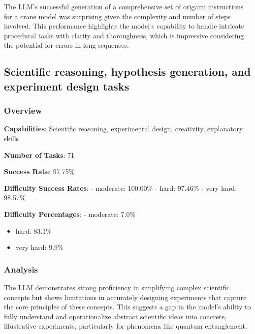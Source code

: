 \documentclass[fleqn,10pt]{wlscirep}
\begin{document}
The LLM's successful generation of a comprehensive set of origami
instructions for a crane model was surprising given the complexity and
number of steps involved. This performance highlights the model's
capability to handle intricate procedural tasks with clarity and
thoroughness, which is impressive considering the potential for errors
in long sequences.

\hypertarget{scientific-reasoning-hypothesis-generation-and-experiment-design-tasks}{%
\subsection{Scientific reasoning, hypothesis generation, and experiment
design
tasks}\label{scientific-reasoning-hypothesis-generation-and-experiment-design-tasks}}

\hypertarget{overview-2}{%
\subsubsection{Overview}\label{overview-2}}

\textbf{Capabilities}: Scientific reasoning, experimental design,
creativity, explanatory skills

\textbf{Number of Tasks}: 71

\textbf{Success Rate}: 97.75\%

\textbf{Difficulty Success Rates}: - moderate: 100.00\% - hard: 97.46\%
- very hard: 98.57\%

\textbf{Difficulty Percentages}: - moderate: 7.0\%

\begin{itemize}
\item
  hard: 83.1\%
\item
  very hard: 9.9\%
\end{itemize}

\hypertarget{analysis-1}{%
\subsubsection{Analysis}\label{analysis-1}}

The LLM demonstrates strong proficiency in simplifying complex
scientific concepts but shows limitations in accurately designing
experiments that capture the core principles of these concepts. This
suggests a gap in the model's ability to fully understand and
operationalize abstract scientific ideas into concrete, illustrative
experiments, particularly for phenomena like quantum entanglement.
\end{document}
